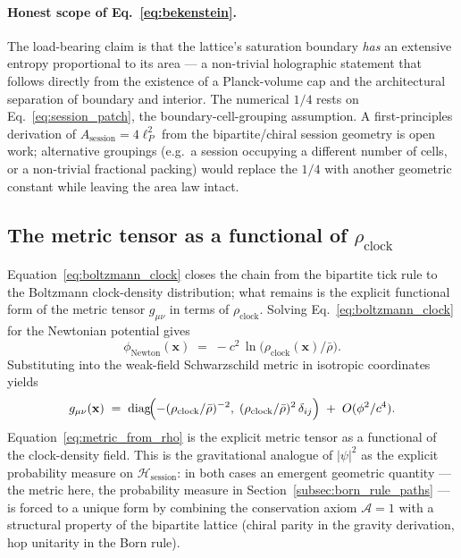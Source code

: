 \paragraph{Honest scope of Eq.~\eqref{eq:bekenstein}.}
The load-bearing claim is that the lattice's saturation boundary
\emph{has} an extensive entropy proportional to its area --- a
non-trivial holographic statement that follows directly from the
existence of a Planck-volume cap and the architectural separation of
boundary and interior.  The numerical $1/4$ rests on
Eq.~\eqref{eq:session_patch}, the boundary-cell-grouping assumption.
A first-principles derivation of $A_\text{session} = 4\ell_P^2$ from
the bipartite/chiral session geometry is open work; alternative
groupings (e.g.\ a session occupying a different number of cells, or
a non-trivial fractional packing) would replace the $1/4$ with another
geometric constant while leaving the area law intact.

\subsection{The metric tensor as a functional of $\rho_\text{clock}$}
\label{subsec:metric_from_rho}

Equation~\eqref{eq:boltzmann_clock} closes the chain from the bipartite
tick rule to the Boltzmann clock-density distribution; what remains is
the explicit functional form of the metric tensor $g_{\mu\nu}$ in
terms of $\rho_\text{clock}$.  Solving Eq.~\eqref{eq:boltzmann_clock}
for the Newtonian potential gives
\begin{equation}
\phi_\mathrm{Newton}(\mathbf{x})
\;=\; -c^2\,\ln\!\bigl(\rho_\text{clock}(\mathbf{x})/\bar\rho\bigr).
\label{eq:phi_of_rho}
\end{equation}
Substituting into the weak-field Schwarzschild metric in isotropic
coordinates yields
\begin{equation}
g_{\mu\nu}(\mathbf{x}) \;=\; \mathrm{diag}\!\Bigl(
  -(\rho_\text{clock}/\bar\rho)^{-2},\;
  (\rho_\text{clock}/\bar\rho)^{2}\,\delta_{ij}\Bigr)
\;+\; O(\phi^2/c^4).
\label{eq:metric_from_rho}
\end{equation}
Equation~\eqref{eq:metric_from_rho} is the explicit metric tensor as
a functional of the clock-density field.  This is the gravitational
analogue of $|\psi|^2$ as the explicit probability measure on
$\mathcal{H}_\text{session}$: in both cases an emergent geometric
quantity --- the metric here, the probability measure in
Section~\ref{subsec:born_rule_paths} --- is forced to a unique form by
combining the conservation axiom $\mathcal{A}=1$ with a structural
property of the bipartite lattice (chiral parity in the gravity
derivation, hop unitarity in the Born rule).

